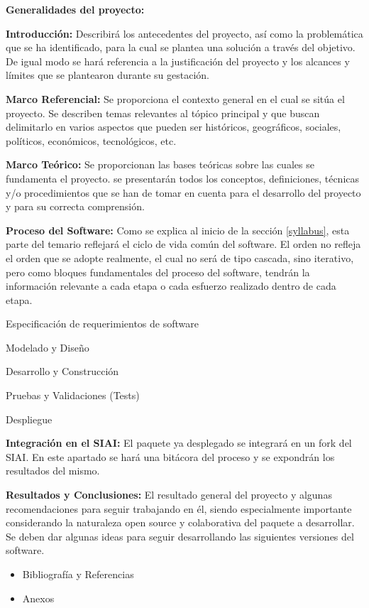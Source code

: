 \begin{tcolorbox}[breakable]
    \begin{syllabus}
        \item \textbf{Generalidades del proyecto:}
        \begin{syllabus}
            \item \textbf{Introducción:} Describirá los antecedentes del proyecto, así como la problemática que se ha identificado, para la cual se plantea una solución a través del objetivo. De igual modo se hará referencia a la justificación del proyecto y los alcances y límites que se plantearon durante su gestación.
            \item \textbf{Marco Referencial:} Se proporciona el contexto general en el cual se sitúa el proyecto. Se describen temas relevantes al tópico principal y que buscan delimitarlo en varios aspectos que pueden ser históricos, geográficos, sociales, políticos, económicos, tecnológicos, etc.
            \item \textbf{Marco Teórico:} Se proporcionan las bases teóricas sobre las cuales se fundamenta el proyecto. se presentarán todos los conceptos, definiciones, técnicas y/o procedimientos que se han de tomar en cuenta para el desarrollo del proyecto y para su correcta comprensión.
        \end{syllabus}
        \item \textbf{Proceso del Software:} Como se explica al inicio de la sección \ref{syllabus}, esta parte del temario reflejará el ciclo de vida común del software. El orden no refleja el orden que se adopte realmente, el cual no será de tipo cascada, sino iterativo, pero como bloques fundamentales del proceso del software, tendrán la información relevante a cada etapa o cada esfuerzo realizado dentro de cada etapa.
        \begin{syllabus}
            \item Especificación de requerimientos de software \cite[104]{pressmanSoftwareEngineeringPractitioner2010}
            \item Modelado y Diseño
            \item Desarrollo y Construcción
            \item Pruebas y Validaciones (Tests)
            \item Despliegue
        \end{syllabus}
        \item \textbf{Integración en el SIAI:} El paquete ya desplegado se integrará en un fork del SIAI. En este apartado se hará una bitácora del proceso y se expondrán los resultados del mismo.
        \item \textbf{Resultados y Conclusiones:} El resultado general del proyecto y algunas recomendaciones para seguir trabajando en él, siendo especialmente importante considerando la naturaleza open source y colaborativa del paquete a desarrollar. Se deben dar algunas ideas para seguir desarrollando las siguientes versiones del software.
    \end{syllabus}

    \begin{itemize}
        \item Bibliografía y Referencias
        \item Anexos
    \end{itemize}
\end{tcolorbox}